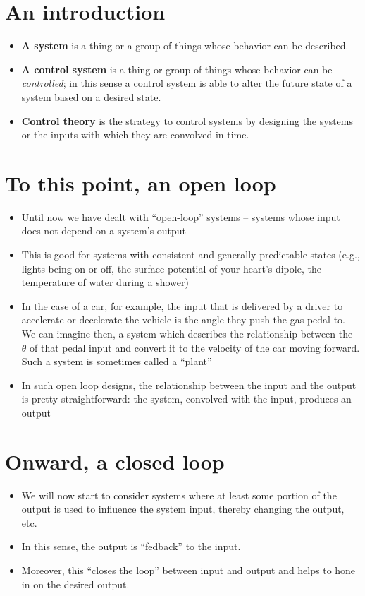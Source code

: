 \documentclass[11pt]{book}
\begin{document}
\section{An introduction}
\begin{itemize}
	\item \textbf{A system} is a thing or a group of things whose behavior can be described.
	\item \textbf{A control system} is a thing or group of things whose behavior can be \textit{controlled}; in this sense a control system is able to alter the future state of a system based on a desired state.
	\item \textbf{Control theory} is the strategy to control systems by designing the systems or the inputs with which they are convolved in time. 
\end{itemize}

\section{To this point, an open loop}
\begin{itemize}
	\item Until now we have dealt with ``open-loop'' systems -- systems whose input does not depend on a system's output
	\item This is good for systems with consistent and generally predictable states (e.g., lights being on or off, the surface potential of your heart's dipole, the temperature of water during a shower)
	\item In the case of a car, for example, the input that is delivered by a driver to accelerate or decelerate the vehicle is the angle they push the gas pedal to. We can imagine then, a system which describes the relationship between the $\theta$ of that pedal input and convert it to the velocity of the car moving forward. Such a system is sometimes called a ``plant''
	\item In such open loop designs, the relationship between the input and the output is pretty straightforward: the system, convolved with the input, produces an output
\end{itemize}

\section{Onward, a closed loop}

\begin{itemize}
	\item We will now start to consider systems where at least some portion of the output is used to influence the system input, thereby changing the output, etc. 
	\item In this sense, the output is ``fedback'' to the input. 
	\item Moreover, this ``closes the loop'' between input and output and helps to hone in on the desired output.
\end{itemize}
\end{document}
